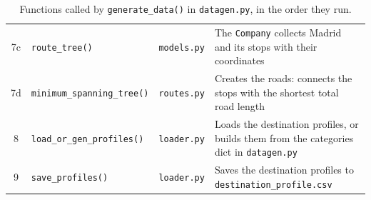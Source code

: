\begin{table}[htbp]
\begin{tabularx}{\textwidth}{@{}c >{\raggedright\arraybackslash}p{4.6cm} >{\raggedright\arraybackslash}p{2.0cm} X@{}}
    7c & \hspace*{1.5em}\texttt{route\_tree()} & \texttt{models.py} & The \texttt{Company} collects Madrid and its stops with their coordinates \\
    7d & \hspace*{1.5em}\texttt{minimum\_spanning\_}\newline\hspace*{1.5em}\texttt{tree()} & \texttt{routes.py} & Creates the roads: connects the stops with the shortest total road length \\
    8 & \texttt{load\_or\_gen\_profiles()} & \texttt{loader.py} & Loads the destination profiles, or builds them from the categories dict in \texttt{datagen.py} \\
    9 & \texttt{save\_profiles()} & \texttt{loader.py} & Saves the destination profiles to \texttt{destination\_profile.csv} \\
    \bottomrule
  \end{tabularx}
  \caption{Functions called by \texttt{generate\_data()} in \texttt{datagen.py}, in the order they run.}
  \label{tab:generate-data}
\end{table}
